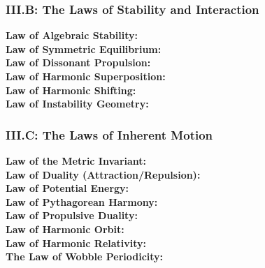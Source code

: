 \subsubsection*{III.B: The Laws of Stability and Interaction}
\begin{description}
    \item[\bfseries Law of Algebraic Stability:] 
    \item[\bfseries Law of Symmetric Equilibrium:] 
    \item[\bfseries Law of Dissonant Propulsion:] 
    \item[\bfseries Law of Harmonic Superposition:] 
    \item[\bfseries Law of Harmonic Shifting:] 
    \item[\bfseries Law of Instability Geometry:] 
\end{description}

\subsubsection*{III.C: The Laws of Inherent Motion}
\begin{description}
    \item[\bfseries Law of the Metric Invariant:] 
    \item[\bfseries Law of Duality (Attraction/Repulsion):] 
    \item[\bfseries Law of Potential Energy:] 
    \item[\bfseries Law of Pythagorean Harmony:] 
    \item[\bfseries Law of Propulsive Duality:] 
    \item[\bfseries Law of Harmonic Orbit:] 
    \item[\bfseries Law of Harmonic Relativity:] 
    \item[\bfseries The Law of Wobble Periodicity:] 
\end{description}


